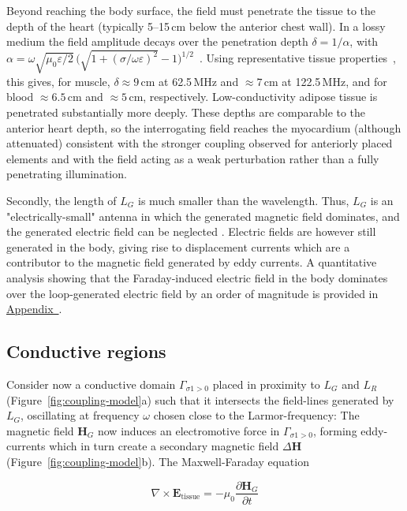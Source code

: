 \documentclass[
]{article}
\newcommand{\appref}[1]{\hyperref[#1]{Appendix~\nameref*{#1}}}
\begin{document}
Beyond reaching the body surface, the field must penetrate the tissue to the depth of the heart (typically 5--15\,cm below the anterior chest wall). In a lossy medium the field amplitude decays over the penetration depth $\delta = 1/\alpha$, with $\alpha = \omega\sqrt{\mu_0\varepsilon/2}\,\big(\sqrt{1+(\sigma/\omega\varepsilon)^2}-1\big)^{1/2}$~\cite{Balanis2012Advanced}. Using representative tissue properties~\cite{HasgallITIS2018}, this gives, for muscle, $\delta \approx 9$\,cm at 62.5\,MHz and $\approx 7$\,cm at 122.5\,MHz, and for blood $\approx 6.5$\,cm and $\approx 5$\,cm, respectively. Low-conductivity adipose tissue is penetrated substantially more deeply. These depths are comparable to the anterior heart depth, so the interrogating field reaches the myocardium (although attenuated) consistent with the stronger coupling observed for anteriorly placed elements and with the field acting as a weak perturbation rather than a fully penetrating illumination.

Secondly, the length of $L_{G}$ is much smaller than the wavelength.
Thus, $L_{G}$ is an "electrically-small" antenna in which the
generated magnetic field dominates, and the generated electric field can
be neglected \cite{Bolton2020OptimalAntenna}. Electric fields are however still generated in
the body, giving rise to displacement currents which are a contributor
to the magnetic field generated by eddy currents. A quantitative analysis showing that the Faraday-induced electric field in the body dominates over the loop-generated electric field by an order of magnitude is provided in \appref{app:derivation}.

\subsection{Conductive regions}\label{conductive-regions}

Consider now a conductive domain $\Gamma_{\sigma 1 > 0}$ placed in
proximity to $L_{G}$ and $L_{R}$ (Figure~\ref{fig:coupling-model}a) such that it intersects
the field-lines generated by $L_{G}$, oscillating at frequency $\omega$ chosen close to the Larmor-frequency: The magnetic field
$\mathbf{H}_{G}$ now induces an electromotive force in
$\Gamma_{\sigma 1 > 0}$, forming eddy-currents which in turn create a
secondary magnetic field $\Delta\mathbf{H}$ (Figure~\ref{fig:coupling-model}b). The
Maxwell-Faraday equation

\begin{equation}
\label{eq:maxwell-faraday-tissue}
\nabla \times \mathbf{E}_{\text{tissue}} = -\mu_0\frac{\partial \mathbf{H}_{G}}{\partial t}
\end{equation}
\end{document}
